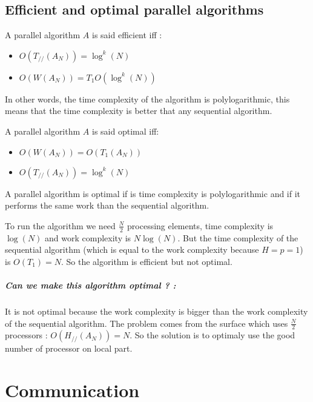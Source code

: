 \documentclass[11pt,a4paper]{report}
\begin{document}
\section{Efficient and optimal parallel algorithms} %
\label{sec:Efficient and optimal parallel algorithms}

A parallel algorithm $A$ is said efficient iff :
\begin{itemize}
    \item $O(T_{//}(A_N)) = \log^k(N)$
    \item $O(W(A_N)) = T_1 O(\log^k(N))$
\end{itemize}

In other words, the time complexity of the algorithm is polylogarithmic, this means that the time complexity is better that any sequential algorithm.

A parallel algorithm $A$ is said optimal iff:
\begin{itemize}
    \item $O(W(A_N)) = O(T_1(A_N))$
    \item $O(T_{//}(A_N)) = \log^k(N)$
\end{itemize}

A parallel algorithm is optimal if is time complexity is polylogarithmic and if it performs the same work than the sequential algorithm.

To run the algorithm we need $\frac{N}{2}$ processing elements, time complexity is $\log(N)$ and work complexity is $N\log(N)$. But the time complexity of the sequential algorithm (which is equal to the work complexity because $H=p=1$) is $O(T_1) = N$. So the algorithm is efficient but not optimal.

\paragraph*{Can we make this algorithm optimal ? :}

It is not optimal because the work complexity is bigger than the work complexity of the sequential algorithm. The problem comes from the surface which uses $\frac{N}{2}$ processors : $O(H_{//}(A_N)) = N$. So the solution is to optimaly use the good number of processor on local part.



\chapter{Communication} %
\label{cha:Communication}

\end{document}
